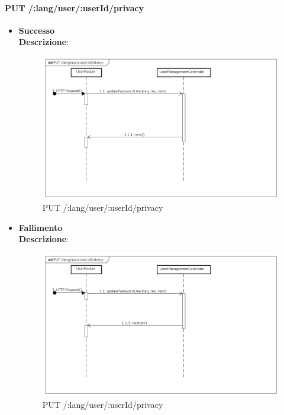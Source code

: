 \paragraph{PUT /:lang/user/:userId/privacy}
\begin{itemize}
\item \textbf{Successo}
\\
\textbf{Descrizione}:
\label{Procedura di modifica password}
\begin{figure}[ht]
	\centering
	\includegraphics[scale=0.40]{UML/DiagrammiDiSequenza/Back-end/PUT_LangUserUserIdPrivacySuccess.png}
	
	\caption{PUT /:lang/user/:userId/privacy}
\end{figure}
\FloatBarrier
\item \textbf{Fallimento}
\\
\textbf{Descrizione}:
\label{Fallimento della procedura di modifica password}
\begin{figure}[ht]
	\centering
	\includegraphics[scale=0.40]{UML/DiagrammiDiSequenza/Back-end/PUT_LangUserUserIdPrivacyFailure.png}
	
	\caption{PUT /:lang/user/:userId/privacy}
\end{figure}
\FloatBarrier
\end{itemize}


